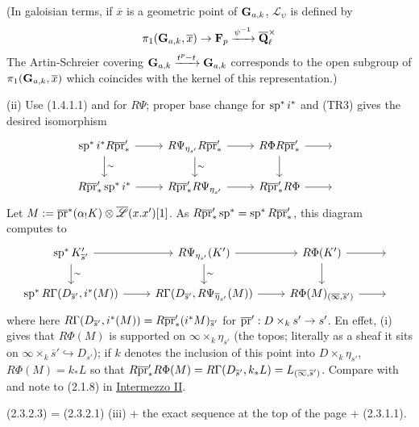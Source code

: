 \documentclass[deligne.tex]{subfiles}
\begin{document}
(In galoisian terms, if $\overline x$ is a geometric point of $\mathbf{G}_{a,k}$,
$\mathscr L_\psi$ is defined by
\begin{equation*}
	\pi_1(\mathbf{G}_{a,k},\overline x)\rightarrow\mathbf{F}_p\xrightarrow{\psi^{-1}}\overline{\mathbf{Q}}_\ell^\times
\end{equation*}
The Artin-Schreier covering $\mathbf{G}_{a,k}\xrightarrow{t^p-t}\mathbf{G}_{a,k}$ corresponds to
the open subgroup of $\pi_1(\mathbf{G}_{a,k},\overline x)$ which coincides with
the kernel of this representation.)

(ii) Use (1.4.1.1) and \cite[Exp. XIII 2.1.7.1]{SGA7} for $R\Psi$;
proper base change for $\operatorname{sp}^*i^*$ and (TR3) gives the desired isomorphism
\begin{equation*}\begin{tikzcd}
	\spe^*i^* R\overline\pr'_*\arrow[r]\arrow[d,"\sim"]&
	R\Psi_{\eta_{s'}} R\overline\pr'_*\arrow[r]\arrow[d,"\sim"]&
	R\Phi R\overline\pr'_*\arrow[r]\arrow[d]&\ \\
	R\overline\pr'_*\spe^*i^*\arrow[r]&
	R\overline\pr'_*R\Psi_{\eta_{s'}}\arrow[r]&
	R\overline\pr'_*R\Phi\arrow[r]&\ 
\end{tikzcd}\end{equation*}
Let $M:=\overline{\operatorname{pr}}^*(\alpha_!K)\otimes\overline{\mathscr L}(x.x')[1]$.
As $R\overline{\operatorname{pr}}'_*\operatorname{sp}^*=\operatorname{sp}^*R\overline{\operatorname{pr}}'_*$, this diagram 
computes to
\begin{equation*}\begin{tikzcd}
	\spe^*K'_{\overline s'}\arrow[r]\arrow[d,"\sim"]&
	R\Psi_{\eta_{s'}}(K')\arrow[r]\arrow[d,"\sim"]&
	R\Phi(K')\arrow[r]\arrow[d]&\ \\
	\spe^*R\Gamma(D_{\overline s'},i^*(M))\arrow[r]&
	R\Gamma(D_{\overline s'},R\Psi_{\overline\eta_{s'}}(M))\arrow[r]&
	R\Phi(M)_{(\overline\infty,\overline s')}\arrow[r]&\ 
\end{tikzcd}\end{equation*}
where here $R\Gamma(D_{\overline s'},i^*(M))=R\overline{\operatorname{pr}}'_*(i^*M)_{\overline s'}$
for $\overline{\operatorname{pr}}':D\times_k s'\rightarrow s'$.
En effet, (i) gives that $R\Phi(M)$ is supported on
$\infty\times_k\eta_{s'}$ (the topos; literally as a sheaf it sits on
$\infty\times_k\overline s'\hookrightarrow D_{\overline s'}$);
if $k$ denotes the inclusion of this point into $D\times_k\eta_{s'}$,
$R\Phi(M)=k_*L$ so that
$R\overline{\operatorname{pr}}'_*R\Phi(M)=R\Gamma(D_{\overline s'},k_*L)=L_{(\overline\infty,\overline s')}$.
Compare with \cite[Exp. XIII 2.1.8]{SGA7} and note to (2.1.8) in \hyperref[sga7:XIII]{Intermezzo II}.

(2.3.2.3) = (2.3.2.1) (iii) + the exact sequence at the top of the
page + (2.3.1.1).
\end{document}
